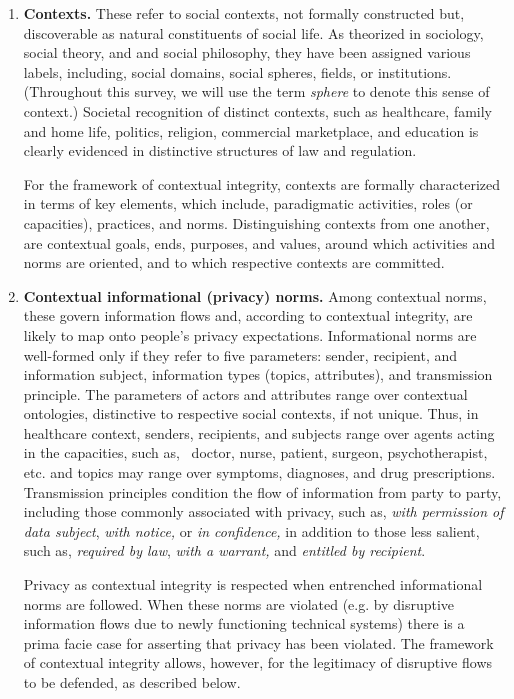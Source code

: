\documentclass[../thesis.tex]{subfiles}
\begin{document}
\begin{enumerate}

\item \textbf{Contexts.} These refer to social contexts, not formally
constructed but, discoverable as natural constituents of social life.
As theorized in sociology, social theory, and and social philosophy,
they have been assigned various labels, including, social domains,
social spheres, fields, or institutions. (Throughout this survey, we
will use the term \textit{sphere} to denote this sense of context.)
Societal recognition of distinct contexts, such as healthcare, family
and home life, politics, religion, commercial marketplace, and
education is clearly evidenced in distinctive structures of law and
regulation. 

For the framework of contextual integrity, contexts are formally
characterized in terms of key elements, which include, paradigmatic
activities, roles (or capacities), practices, and norms.
Distinguishing contexts from one another, are contextual goals, ends,
purposes, and values, around which activities and norms are oriented,
and to which respective contexts are committed.


\item \textbf{Contextual informational (privacy) norms.} Among
contextual norms, these govern information flows and, according to
contextual integrity, are likely to map onto people's
privacy expectations. Informational norms are well-formed only if
they refer to five parameters: sender, recipient, and information
subject, information types (topics, attributes), and transmission
principle. The parameters of actors and attributes range over
contextual ontologies, distinctive to respective social contexts, if
not unique. Thus, in healthcare context, senders, recipients, and
subjects range over agents acting in the capacities, such as,
\ doctor, nurse, patient, surgeon, psychotherapist, etc. and
topics may range over symptoms, diagnoses, and drug
prescriptions. Transmission principles condition the flow of
information from party to party, including those commonly associated
with privacy, such as, \textit{with permission of data subject},
\textit{with notice,} or \textit{in confidence, }in addition to those
less salient, such as, \textit{required by law}, \textit{with a
warrant,} and \textit{entitled by recipient}.

Privacy as contextual integrity is respected when entrenched
informational norms are followed. When these norms are violated (e.g.
by disruptive information flows due to newly functioning technical
systems) there is a prima facie case for asserting that privacy has
been violated. The framework of contextual integrity allows, however,
for the legitimacy of disruptive flows to be defended, as described
below. 



\end{enumerate}
\end{document}
